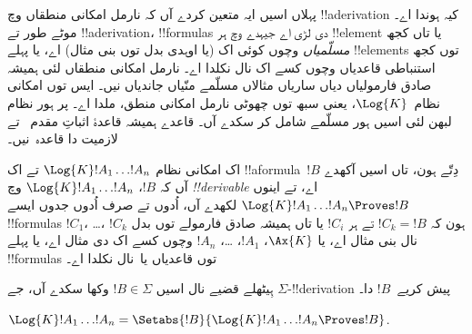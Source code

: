 \documentclass[../../../include/open-logic-section]{subfiles}
\begin{document}


پہلاں اسیں ایہ متعین کردے آں کہ نارمل امکانی منطقاں وچ !!a{derivation} کیہ ہوندا اے۔ موٹے طور تے !!a{derivation}، !!{formula}s دی لڑی اے جیہدے وچ ہر !!{element} یا تاں کجھ \emph{مسلّمیاں} وچوں کوئی اک (یا اوہدی بدل توں بنی مثال) اے، یا پہلے !!{element}s توں کجھ استنباطی قاعدیاں وچوں کسے اک نال نکلدا اے۔ نارمل امکانی منطقاں لئی ہمیشہ صادق فارمولیاں دیاں ساریاں مثالاں مسلّمے منّیاں جاندیاں نیں۔ ایس توں امکانی نظام~$\Log{K}$، یعنی سبھ توں چھوٹی نارمل امکانی منطق، ملدا اے۔ پر ہور نظام لبھن لئی اسیں ہور مسلّمے شامل کر سکدے آں۔ قاعدے ہمیشہ قاعدۂ اثباتِ مقدم~\MP{} تے لازمیت دا قاعدہ~\Nec نیں۔

\begin{defn}
  اک امکانی نظام $\Log{K} !A_1 \dots !A_n$ تے اک !!a{formula}~$!B$ دِتّے ہون، تاں اسیں آکھدے آں کہ $!B$،
  $\Log{K} !A_1 \dots
  !A_n$ وچ \emph{!!{derivable}} اے، تے اینوں $\Log{K} !A_1 \dots !A_n \Proves !B$ لکھدے آں، اُدوں تے صرف اُدوں جدوں ایسے !!{formula}s $!C_1$، \dots، $!C_k$ ہون کہ $!C_k = !B$ تے ہر $!C_i$ یا تاں ہمیشہ صادق فارمولے توں بدل نال بنی مثال اے، یا $\Ax{K}$، $!A_1$،
  \dots، $!A_n$ وچوں کسے اک دی مثال اے، یا پہلے !!{formula}s توں قاعدیاں \MP{} یا~\Nec نال نکلدا اے۔
\end{defn}

ہِیٹھلے قضیے نال اسیں $!B \in \Sigma$ وکھا سکدے آں، جے $\Sigma$-!!{derivation} پیش کریے~$!B$ دا۔

\begin{prop}
  $\Log{K} !A_1 \dots !A_n = \Setabs{!B}{\Log{K} !A_1 \dots !A_n \Proves !B}$.
\end{prop}
\end{document}
